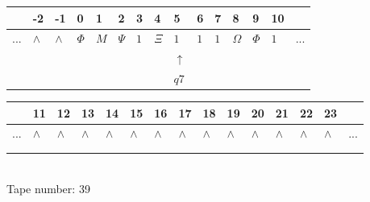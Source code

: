 \documentclass[11pt]{article}
\begin{document}
\begin{table}[H]
\centering
\begin{tabular}{lllllllllllllll}
 & -2 & -1 & 0 & 1 & 2 & 3 & 4 & 5 & 6 & 7 & 8 & 9 & 10 & \\
\hline
$...$ & \multicolumn{1}{|l|}{$\wedge$} & \multicolumn{1}{|l|}{$\wedge$} & \multicolumn{1}{|l|}{$\Phi$} & \multicolumn{1}{|l|}{$M$} & \multicolumn{1}{|l|}{$\Psi$} & \multicolumn{1}{|l|}{$1$} & \multicolumn{1}{|l|}{$\Xi$} & \multicolumn{1}{|l|}{$1$} & \multicolumn{1}{|l|}{$1$} & \multicolumn{1}{|l|}{$1$} & \multicolumn{1}{|l|}{$\Omega$} & \multicolumn{1}{|l|}{$\Phi$} & \multicolumn{1}{|l|}{$1$} & $...$\\
\hline
&  &  &  &  &  &  &  & $\uparrow$ &  &  &  &  &  &  \\
&  &  &  &  &  &  &  & $ q7 $ &  &  &  &  &  &  \\
\end{tabular}
\begin{tabular}{lllllllllllllll}
 & 11 & 12 & 13 & 14 & 15 & 16 & 17 & 18 & 19 & 20 & 21 & 22 & 23 & \\
\hline
$...$ & \multicolumn{1}{|l|}{$\wedge$} & \multicolumn{1}{|l|}{$\wedge$} & \multicolumn{1}{|l|}{$\wedge$} & \multicolumn{1}{|l|}{$\wedge$} & \multicolumn{1}{|l|}{$\wedge$} & \multicolumn{1}{|l|}{$\wedge$} & \multicolumn{1}{|l|}{$\wedge$} & \multicolumn{1}{|l|}{$\wedge$} & \multicolumn{1}{|l|}{$\wedge$} & \multicolumn{1}{|l|}{$\wedge$} & \multicolumn{1}{|l|}{$\wedge$} & \multicolumn{1}{|l|}{$\wedge$} & \multicolumn{1}{|l|}{$\wedge$} & $...$\\
\hline
&  &  &  &  &  &  &  &  &  &  &  &  &  &  \\
&  &  &  &  &  &  &  &  &  &  &  &  &  &  \\
\end{tabular}
\\
Tape number: 39
\noindent\makebox[\linewidth]{\hdashrule{\textwidth}{1pt}{1pt}}\end{table}
\clearpage
\end{document}
